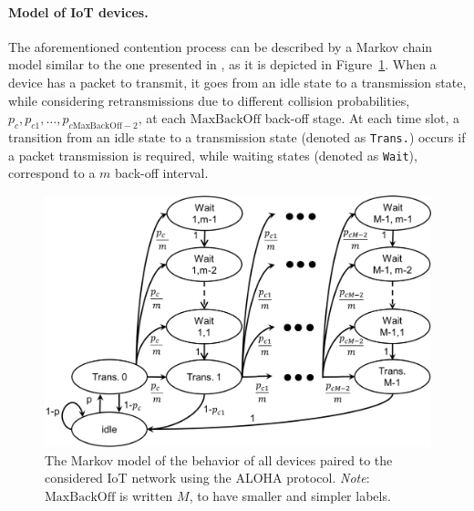 \paragraph{Model of IoT devices.}

The aforementioned contention process can be described by a Markov chain model \cite{Norris98} similar to the one presented in \cite{Yang12}, as it is depicted in Figure~\ref{fig:43:Markov_model}.
When a device has a packet to transmit, it goes from an idle state to a transmission state, while considering retransmissions due to different collision probabilities, $p_{c}, p_{c1}, \dots, p_{c\mathrm{MaxBackOff}-2}$, at each $\mathrm{MaxBackOff}$ back-off stage.
At each time slot, a transition from an idle state to a transmission state (denoted as \texttt{Trans.}) occurs if a packet transmission is required, while waiting states (denoted as \texttt{Wait}), correspond to a $m$ back-off interval.

\begin{figure}[!h]
	\centering
	\includegraphics[width=0.70\linewidth]{Markov_model.eps}
	\caption{The Markov model of the behavior of all devices paired to the considered IoT network using the ALOHA protocol. \emph{Note}: $\mathrm{MaxBackOff}$ is written $M$, to have smaller and simpler labels.}
	\label{fig:43:Markov_model}
\end{figure}

